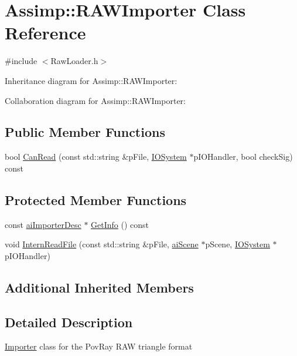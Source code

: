 \hypertarget{class_assimp_1_1_r_a_w_importer}{\section{Assimp\+:\+:R\+A\+W\+Importer Class Reference}
\label{class_assimp_1_1_r_a_w_importer}
}


{\ttfamily \#include $<$Raw\+Loader.\+h$>$}



Inheritance diagram for Assimp\+:\+:R\+A\+W\+Importer\+:


Collaboration diagram for Assimp\+:\+:R\+A\+W\+Importer\+:
\subsection*{Public Member Functions}
\begin{DoxyCompactItemize}
\item 
bool \hyperlink{class_assimp_1_1_r_a_w_importer_aa9d9ea763ab2a5efef57fc8217773173}{Can\+Read} (const std\+::string \&p\+File, \hyperlink{class_assimp_1_1_i_o_system}{I\+O\+System} $\ast$p\+I\+O\+Handler, bool check\+Sig) const 
\end{DoxyCompactItemize}
\subsection*{Protected Member Functions}
\begin{DoxyCompactItemize}
\item 
const \hyperlink{structai_importer_desc}{ai\+Importer\+Desc} $\ast$ \hyperlink{class_assimp_1_1_r_a_w_importer_aeb951c73f5fb7bb7653e55e7a9b688ff}{Get\+Info} () const 
\item 
void \hyperlink{class_assimp_1_1_r_a_w_importer_af925a691a795d82a078bdb332c51e8cd}{Intern\+Read\+File} (const std\+::string \&p\+File, \hyperlink{structai_scene}{ai\+Scene} $\ast$p\+Scene, \hyperlink{class_assimp_1_1_i_o_system}{I\+O\+System} $\ast$p\+I\+O\+Handler)
\end{DoxyCompactItemize}
\subsection*{Additional Inherited Members}


\subsection{Detailed Description}
\hyperlink{class_assimp_1_1_importer}{Importer} class for the Pov\+Ray R\+A\+W triangle format 

